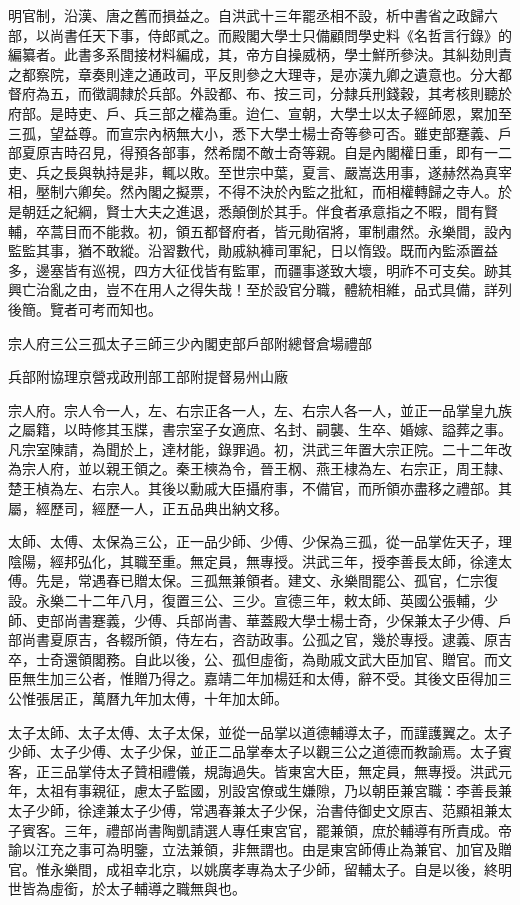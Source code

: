 

明官制，沿漢、唐之舊而損益之。自洪武十三年罷丞相不設，析中書省之政歸六部，以尚書任天下事，侍郎貳之。而殿閣大學士只備顧問學史料《名哲言行錄》的編纂者。此書多系間接材料編成，其，帝方自操威柄，學士鮮所參決。其糾劾則責之都察院，章奏則達之通政司，平反則參之大理寺，是亦漢九卿之遺意也。分大都督府為五，而徵調隸於兵部。外設都、布、按三司，分隸兵刑錢穀，其考核則聽於府部。是時吏、戶、兵三部之權為重。迨仁、宣朝，大學士以太子經師恩，累加至三孤，望益尊。而宣宗內柄無大小，悉下大學士楊士奇等參可否。雖吏部蹇義、戶部夏原吉時召見，得預各部事，然希闊不敵士奇等親。自是內閣權日重，即有一二吏、兵之長與執持是非，輒以敗。至世宗中葉，夏言、嚴嵩迭用事，遂赫然為真宰相，壓制六卿矣。然內閣之擬票，不得不決於內監之批紅，而相權轉歸之寺人。於是朝廷之紀綱，賢士大夫之進退，悉顛倒於其手。伴食者承意指之不暇，間有賢輔，卒蒿目而不能救。初，領五都督府者，皆元勛宿將，軍制肅然。永樂間，設內監監其事，猶不敢縱。沿習數代，勛戚紈褲司軍紀，日以惰毀。既而內監添置益多，邊塞皆有巡視，四方大征伐皆有監軍，而疆事遂致大壞，明祚不可支矣。跡其興亡治亂之由，豈不在用人之得失哉！至於設官分職，體統相維，品式具備，詳列後簡。覽者可考而知也。

宗人府三公三孤太子三師三少內閣吏部戶部附總督倉場禮部

兵部附協理京營戎政刑部工部附提督易州山廠

宗人府。宗人令一人，左、右宗正各一人，左、右宗人各一人，並正一品掌皇九族之屬籍，以時修其玉牒，書宗室子女適庶、名封、嗣襲、生卒、婚嫁、謚葬之事。凡宗室陳請，為聞於上，達材能，錄罪過。初，洪武三年置大宗正院。二十二年改為宗人府，並以親王領之。秦王樉為令，晉王㭎、燕王棣為左、右宗正，周王隸、楚王楨為左、右宗人。其後以勳戚大臣攝府事，不備官，而所領亦盡移之禮部。其屬，經歷司，經歷一人，正五品典出納文移。

太師、太傅、太保為三公，正一品少師、少傅、少保為三孤，從一品掌佐天子，理陰陽，經邦弘化，其職至重。無定員，無專授。洪武三年，授李善長太師，徐達太傅。先是，常遇春已贈太保。三孤無兼領者。建文、永樂間罷公、孤官，仁宗復設。永樂二十二年八月，復置三公、三少。宣德三年，敕太師、英國公張輔，少師、吏部尚書蹇義，少傅、兵部尚書、華蓋殿大學士楊士奇，少保兼太子少傅、戶部尚書夏原吉，各輟所領，侍左右，咨訪政事。公孤之官，幾於專授。逮義、原吉卒，士奇還領閣務。自此以後，公、孤但虛銜，為勛戚文武大臣加官、贈官。而文臣無生加三公者，惟贈乃得之。嘉靖二年加楊廷和太傅，辭不受。其後文臣得加三公惟張居正，萬曆九年加太傅，十年加太師。

太子太師、太子太傅、太子太保，並從一品掌以道德輔導太子，而謹護翼之。太子少師、太子少傅、太子少保，並正二品掌奉太子以觀三公之道德而教諭焉。太子賓客，正三品掌侍太子贊相禮儀，規誨過失。皆東宮大臣，無定員，無專授。洪武元年，太祖有事親征，慮太子監國，別設宮僚或生嫌隙，乃以朝臣兼宮職：李善長兼太子少師，徐達兼太子少傅，常遇春兼太子少保，治書侍御史文原吉、范顯祖兼太子賓客。三年，禮部尚書陶凱請選人專任東宮官，罷兼領，庶於輔導有所責成。帝諭以江充之事可為明鑒，立法兼領，非無謂也。由是東宮師傅止為兼官、加官及贈官。惟永樂間，成祖幸北京，以姚廣孝專為太子少師，留輔太子。自是以後，終明世皆為虛銜，於太子輔導之職無與也。

